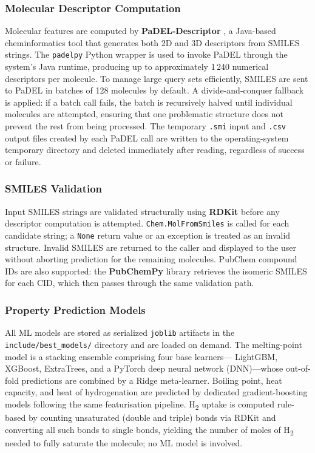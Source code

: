 \subsubsection*{Molecular Descriptor Computation}
Molecular features are computed by \textbf{PaDEL-Descriptor}
\cite{Yap2011}, a Java-based cheminformatics tool that generates both
2D and 3D descriptors from SMILES strings.
The \texttt{padelpy} Python wrapper is used to invoke PaDEL through the
system's Java runtime, producing up to approximately 1\,240 numerical
descriptors per molecule.
To manage large query sets efficiently, SMILES are sent to PaDEL in batches of
128 molecules by default.
A divide-and-conquer fallback is applied: if a batch call fails, the batch is
recursively halved until individual molecules are attempted, ensuring that one
problematic structure does not prevent the rest from being processed.
The temporary \texttt{.smi} input and \texttt{.csv} output files created by
each PaDEL call are written to the operating-system temporary directory and
deleted immediately after reading, regardless of success or failure.

\subsubsection*{SMILES Validation}
Input SMILES strings are validated structurally using \textbf{RDKit}
\cite{Landrum2006} before any descriptor computation is attempted.
\texttt{Chem.MolFromSmiles} is called for each candidate string; a
\texttt{None} return value or an exception is treated as an invalid structure.
Invalid SMILES are returned to the caller and displayed to the user without
aborting prediction for the remaining molecules.
PubChem compound IDs are also supported: the \textbf{PubChemPy} library
retrieves the isomeric SMILES for each CID, which then passes through the same
validation path.

\subsubsection*{Property Prediction Models}
All ML models are stored as serialized \texttt{joblib} artifacts in the
\texttt{include/best\_models/} directory and are loaded on demand.
The melting-point model is a stacking ensemble comprising four base learners---
LightGBM, XGBoost, ExtraTrees, and a PyTorch deep neural network (DNN)---whose
out-of-fold predictions are combined by a Ridge meta-learner.
Boiling point, heat capacity, and heat of hydrogenation are predicted by
dedicated gradient-boosting models following the same featurisation pipeline.
H\textsubscript{2} uptake is computed rule-based by counting unsaturated
(double and triple) bonds via RDKit and converting all such bonds to single
bonds, yielding the number of moles of H\textsubscript{2} needed to
fully saturate the molecule; no ML model is involved.

